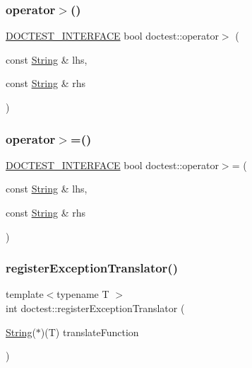 \mbox{\label{namespacedoctest_acef5990b03a973c74ff2dd6cfc112913}} 
\subsubsection{\texorpdfstring{operator$>$()}{operator>()}}
{\footnotesize\ttfamily \mbox{\hyperlink{doctest_8h_a9c16ffc635ec47f07797d21ede26b1a5}{D\+O\+C\+T\+E\+S\+T\+\_\+\+I\+N\+T\+E\+R\+F\+A\+CE}} bool doctest\+::operator$>$ (\begin{DoxyParamCaption}\item[{const \mbox{\hyperlink{classdoctest_1_1_string}{String}} \&}]{lhs,  }\item[{const \mbox{\hyperlink{classdoctest_1_1_string}{String}} \&}]{rhs }\end{DoxyParamCaption})}

\mbox{\label{namespacedoctest_ac32accb42e937cf870de2f6865ea236a}} 
\subsubsection{\texorpdfstring{operator$>$=()}{operator>=()}}
{\footnotesize\ttfamily \mbox{\hyperlink{doctest_8h_a9c16ffc635ec47f07797d21ede26b1a5}{D\+O\+C\+T\+E\+S\+T\+\_\+\+I\+N\+T\+E\+R\+F\+A\+CE}} bool doctest\+::operator$>$= (\begin{DoxyParamCaption}\item[{const \mbox{\hyperlink{classdoctest_1_1_string}{String}} \&}]{lhs,  }\item[{const \mbox{\hyperlink{classdoctest_1_1_string}{String}} \&}]{rhs }\end{DoxyParamCaption})}

\mbox{\label{namespacedoctest_a8e23e6bb4c6982688652060dbe41385d}} 
\subsubsection{\texorpdfstring{register\+Exception\+Translator()}{registerExceptionTranslator()}}
{\footnotesize\ttfamily template$<$typename T $>$ \\
int doctest\+::register\+Exception\+Translator (\begin{DoxyParamCaption}\item[{\mbox{\hyperlink{classdoctest_1_1_string}{String}}($\ast$)(T)}]{translate\+Function }\end{DoxyParamCaption})}

